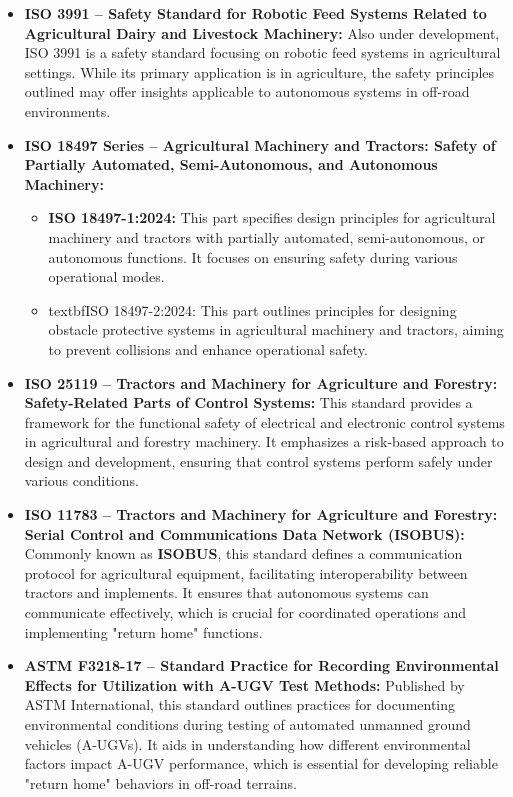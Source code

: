 \documentclass[runningheads]{llncs}
\begin{document}
\begin{itemize}
  \item \textbf{ISO 3991 – Safety Standard for Robotic Feed Systems Related to Agricultural Dairy and Livestock Machinery:} Also under development, ISO 3991 is a safety standard focusing on robotic feed systems in agricultural settings. While its primary application is in agriculture, the safety principles outlined may offer insights applicable to autonomous systems in off-road environments.

  \item \textbf{ISO 18497 Series – Agricultural Machinery and Tractors: Safety of Partially Automated, Semi-Autonomous, and Autonomous Machinery: }


  \begin{itemize}
    \item \textbf{ ISO 18497-1:2024:} This part specifies design principles for agricultural machinery and tractors with partially automated, semi-autonomous, or autonomous functions. It focuses on ensuring safety during various operational modes.
    \item textbf{ISO 18497-2:2024:} This part outlines principles for designing obstacle protective systems in agricultural machinery and tractors, aiming to prevent collisions and enhance operational safety.
  \end{itemize}

  \item \textbf{ISO 25119 – Tractors and Machinery for Agriculture and Forestry: Safety-Related Parts of Control Systems:} This standard provides a framework for the functional safety of electrical and electronic control systems in agricultural and forestry machinery. It emphasizes a risk-based approach to design and development, ensuring that control systems perform safely under various conditions.

  \item \textbf{ISO 11783 – Tractors and Machinery for Agriculture and Forestry: Serial Control and Communications Data Network (ISOBUS):}   Commonly known as \textbf{ISOBUS}, this standard defines a communication protocol for agricultural equipment, facilitating interoperability between tractors and implements. It ensures that autonomous systems can communicate effectively, which is crucial for coordinated operations and implementing "return home" functions.

  \item \textbf{ASTM F3218-17 – Standard Practice for Recording Environmental Effects for Utilization with A-UGV Test Methods:} Published by ASTM International, this standard outlines practices for documenting environmental conditions during testing of automated unmanned ground vehicles (A-UGVs). It aids in understanding how different environmental factors impact A-UGV performance, which is essential for developing reliable "return home" behaviors in off-road terrains.


\end{itemize}
\end{document}
